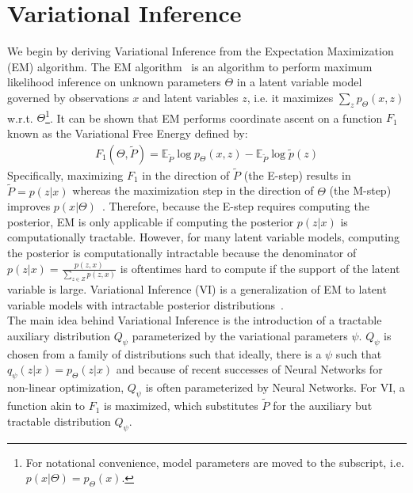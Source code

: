 
\section{Variational Inference}
\label{sec:format}
We begin by deriving Variational Inference from the Expectation Maximization (EM) algorithm. The EM algorithm~\cite{dempster1977maximum} is an algorithm to perform maximum likelihood inference on unknown parameters $\Theta$ in a latent variable model governed by observations $x$ and latent variables $z$, i.e. it maximizes $\sum_z p_\Theta(x,z)$ w.r.t. $\Theta$\footnote{For notational convenience, model parameters are moved to the subscript, i.e. $p(x|\Theta) = p_\Theta(x)$.}. It can be shown that EM performs coordinate ascent on a function $F_1$ known as the Variational Free Energy defined by:
\begin{align*}
F_{1}(\Theta, \tilde{P}) = \mathbb{E}_{\tilde{P}} \log p_\Theta(x,z) - \mathbb{E}_{\tilde{P}} \log \tilde{p}(z)
\end{align*} Specifically, maximizing $F_1$ in the direction of $\tilde{P}$ (the E-step) results in $\tilde{P} = p(z|x)$ whereas the maximization step in the direction of $\Theta$ (the M-step) improves $p(x|\Theta)$~\cite{neal1998view}. Therefore, because the E-step requires computing the posterior, EM is only applicable if computing the posterior $p(z|x)$ is computationally tractable. However, for many latent variable models, computing the posterior is computationally intractable because the denominator of $p(z|x)=\frac{p(z,x)}{\sum_{z\in Z} p(z,x)}$ is oftentimes hard to compute if the support of the latent variable is large. Variational Inference (VI) is a generalization of EM to latent variable models with intractable posterior distributions~\cite{jordan1999introduction}.\\
The main idea behind Variational Inference is the introduction of a tractable auxiliary distribution $Q_\psi$ parameterized by the variational parameters $\psi$. $Q_\psi$ is chosen from a family of distributions such that ideally, there is a $\psi$ such that $q_\psi(z|x) = p_\Theta(z|x)$ and because of recent successes of Neural Networks for non-linear optimization, $Q_\psi$ is often parameterized by Neural Networks. For VI, a function akin to $F_1$ is maximized, which substitutes $\tilde{P}$ for the auxiliary but tractable distribution $Q_\psi$.
